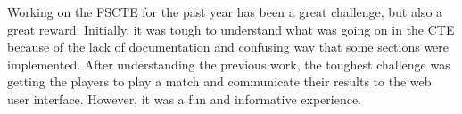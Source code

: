 \documentclass[a4paper, 12pt]{report}
\begin{document}
Working on the FSCTE for the past year has been a great challenge, but also a
great reward. Initially, it was tough to understand what was going on in the CTE
because of the lack of documentation and confusing way that some sections were
implemented. After understanding the previous work, the toughest challenge was
getting the players to play a match and communicate their results to the web
user interface. However, it was a fun and informative experience.

\printbibliography
\end{document}
